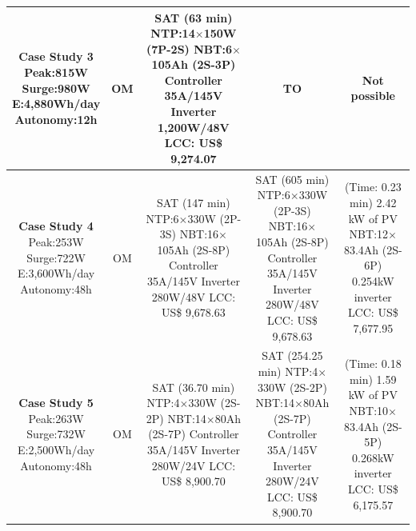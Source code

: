\documentclass[runningheads]{llncs}
\begin{document}
\begin{table}
\begin{scriptsize}
\begin{tabular}{c|c|c|c|c}
\hline
\makecell{\textbf{Case Study 3}\\Peak:815W\\Surge:980W\\E:4,880Wh/day\\Autonomy:12h} & OM & \makecell{SAT (63 min) \\NTP:14$\times$150W (7P-2S)\\NBT:6$\times$105Ah (2S-3P)\\Controller 35A/145V\\Inverter 1,200W/48V\\LCC: US\$ 9,274.07} & TO & Not possible \\
\hline
\makecell{\textbf{Case Study 4}\\Peak:253W\\Surge:722W\\E:3,600Wh/day\\Autonomy:48h} & OM & \makecell{SAT (147 min) \\NTP:6$\times$330W (2P-3S)\\NBT:16$\times$105Ah (2S-8P)\\Controller 35A/145V\\Inverter 280W/48V\\LCC: US\$ 9,678.63} & \makecell{SAT (605 min) \\NTP:6$\times$330W (2P-3S)\\NBT:16$\times$105Ah (2S-8P)\\Controller 35A/145V\\Inverter 280W/48V\\LCC: US\$ 9,678.63} & \makecell{(Time: 0.23 min)\\2.42 kW of PV\\NBT:12$\times$83.4Ah (2S-6P)\\0.254kW inverter\\LCC: US\$ 7,677.95}\\
\hline
\makecell{\textbf{Case Study 5}\\Peak:263W\\Surge:732W\\E:2,500Wh/day\\Autonomy:48h} & OM & \makecell {SAT (36.70 min) \\NTP:4$\times$330W (2S-2P)\\NBT:14$\times$80Ah (2S-7P)\\Controller 35A/145V\\Inverter 280W/24V \\LCC: US\$ 8,900.70}  & \makecell {SAT (254.25 min) \\NTP:4$\times$330W (2S-2P)\\NBT:14$\times$80Ah (2S-7P)\\Controller 35A/145V\\Inverter 280W/24V \\LCC: US\$ 8,900.70} & \makecell{(Time: 0.18 min)\\1.59 kW of PV\\NBT:10$\times$83.4Ah (2S-5P)\\0.268kW inverter\\LCC: US\$ 6,175.57} \\

\end{tabular}
\end{scriptsize}
\end{table}
\end{document}
